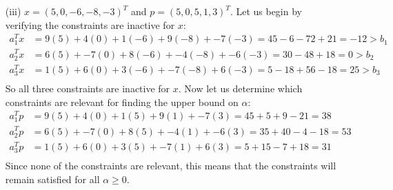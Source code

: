 \documentclass{article}
\begin{document}
\begin{itemize}
        \item[(iii)] $x = (5,0,-6,-8,-3)^T$ and $p = (5,0,5,1,3)^T$.
        \newline\newline
        Let us begin by verifying the constraints are inactive for $x$:
        \begin{align*}
            a_1^Tx &= 9(5) + 4(0) + 1(-6) + 9(-8) + -7(-3) = 45 - 6 - 72 + 21 = -12 > b_1 \\
            a_2^Tx &= 6(5) + -7(0) + 8(-6) + -4(-8) + -6(-3) = 30 - 48 + 18 = 0 > b_2 \\
            a_3^Tx &= 1(5) + 6(0) + 3(-6) + -7(-8) + 6(-3) = 5 - 18 + 56 - 18 = 25 > b_3 \\
        \end{align*}
        So all three constraints are inactive for $x$. Now let us determine which constraints are relevant for finding the upper bound on $\alpha$:
        \begin{align*}
            a_1^Tp &= 9(5) + 4(0) + 1(5) + 9(1) + -7(3) = 45 + 5 + 9 - 21 = 38 \\
            a_2^Tp &= 6(5) + -7(0) + 8(5) + -4(1) + -6(3) = 35 + 40 - 4 - 18 = 53 \\
            a_3^Tp &= 1(5) + 6(0) + 3(5) + -7(1) + 6(3) = 5 + 15 - 7 + 18 = 31 \\
        \end{align*}
        Since none of the constraints are relevant, this means that the constraints will remain satisfied for all $\alpha \geq 0$.
        

\end{itemize}
\end{document}
